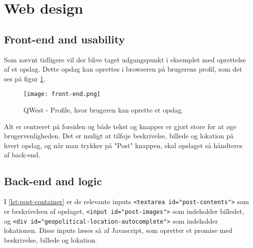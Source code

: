 \section{Web design}\label{sec:webdesign}
\subsection{Front-end and usability}\label{sec:frontend}
Som nævnt tidligere vil der blive taget udgangspunkt i eksemplet med oprettelse af et opslag. Dette opslag kan oprettes i browseren på brugerens profil, som det ses på figur \ref{fig:frontend}.

\begin{figure}
    \texttt{[image: front-end.png]}
    \caption{QWest - Profile, hvor brugeren kan oprette et opslag.}
    \label{fig:frontend}
\end{figure}

Alt er centreret på forsiden og både tekst og knapper er gjort store for at øge brugervenligheden. Det er muligt at tilføje beskrivelse, billede og lokation på hvert opslag, og når man trykker på "Post" knappen, skal opslaget så håndteres af back-end. 

\subsection{Back-end and logic}\label{sec:backend}


I \ref{lst:post-container} er de relevante inputs \texttt{<textarea id="post-contents">} som er beskrivelsen af opslaget, \texttt{<input id="post-images">} som indeholder billedet, og \texttt{<div id="geopolitical-location-autocomplete">} som indeholder lokationen. 
Disse inputs læses så af Javascript, som opretter et promise\cite{promise} med beskrivelse, billede og lokation.

